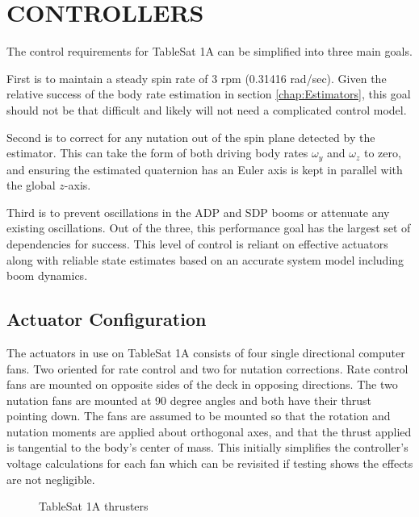 
\chapter{CONTROLLERS}
\label{chap:Controllers}

The control requirements for TableSat 1A can be simplified into three main goals.

First is to maintain a steady spin rate of 3 rpm (0.31416 rad/sec).  Given the relative success of the body rate estimation in section \ref{chap:Estimators}, this goal should not be that difficult and likely will not need a complicated control model.

Second is to correct for any nutation out of the spin plane detected by the estimator.  This can take the form of both driving body rates $\omega_y$ and $\omega_z$ to zero, and ensuring the estimated quaternion has an Euler axis is kept in parallel with the global $z$-axis.

Third is to prevent oscillations in the ADP and SDP booms or attenuate any existing oscillations.  Out of the three, this performance goal has the largest set of dependencies for success.  This level of control is reliant on effective actuators along with reliable state estimates based on an accurate system model including boom dynamics.

\section{Actuator Configuration}
\label{sec:ActuatorConfiguration}

The actuators in use on TableSat 1A consists of four single directional computer fans.  Two oriented for rate control and two for nutation corrections.  Rate control fans are mounted on opposite sides of the deck in opposing directions.  The two nutation fans are mounted at 90 degree angles and both have their thrust pointing down.  The fans are assumed to be mounted so that the rotation and nutation moments are applied about orthogonal axes, and that the thrust applied is tangential to the body's center of mass.  This initially simplifies the controller's voltage calculations for each fan which can be revisited if testing shows the effects are not negligible.

\begin{figure}[H]
  \centerline{}
  \caption{TableSat 1A thrusters}
  \label{fig:TSatThrusters}
\end{figure}

